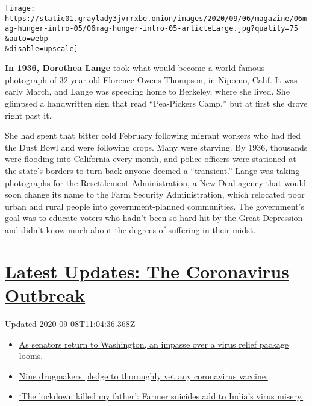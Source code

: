 \texttt{[image: https://static01.graylady3jvrrxbe.onion/images/2020/09/06/magazine/06mag-hunger-intro-05/06mag-hunger-intro-05-articleLarge.jpg?quality=75\\\&auto=webp\\\&disable=upscale]}

\textbf{In 1936, Dorothea Lange} took what would become a world-famous
photograph of 32-year-old Florence Owens Thompson, in Nipomo, Calif. It
was early March, and Lange was speeding home to Berkeley, where she
lived. She glimpsed a handwritten sign that read ``Pea-Pickers Camp,''
but at first she drove right past it.

She had spent that bitter cold February following migrant workers who
had fled the Dust Bowl and were following crops. Many were starving. By
1936, thousands were flooding into California every month, and police
officers were stationed at the state's borders to turn back anyone
deemed a ``transient.'' Lange was taking photographs for the
Resettlement Administration, a New Deal agency that would soon change
its name to the Farm Security Administration, which relocated poor urban
and rural people into government-planned communities. The government's
goal was to educate voters who hadn't been so hard hit by the Great
Depression and didn't know much about the degrees of suffering in their
midst.

\hypertarget{latest-updates-the-coronavirus-outbreak}{%
\section{\texorpdfstring{\href{https://www.nytimes3xbfgragh.onion/2020/09/08/world/covid-19-coronavirus.html?action=click\&pgtype=Article\&state=default\&region=MAIN_CONTENT_1\&context=storylines_live_updates}{Latest
Updates: The Coronavirus
Outbreak}}{Latest Updates: The Coronavirus Outbreak}}\label{latest-updates-the-coronavirus-outbreak}}

Updated 2020-09-08T11:04:36.368Z

\begin{itemize}
\tightlist
\item
  \href{https://www.nytimes3xbfgragh.onion/2020/09/08/world/covid-19-coronavirus.html?action=click\&pgtype=Article\&state=default\&region=MAIN_CONTENT_1\&context=storylines_live_updates\#link-4a77847f}{As
  senators return to Washington, an impasse over a virus relief package
  looms.}
\item
  \href{https://www.nytimes3xbfgragh.onion/2020/09/08/world/covid-19-coronavirus.html?action=click\&pgtype=Article\&state=default\&region=MAIN_CONTENT_1\&context=storylines_live_updates\#link-679303d7}{Nine
  drugmakers pledge to thoroughly vet any coronavirus vaccine.}
\item
  \href{https://www.nytimes3xbfgragh.onion/2020/09/08/world/covid-19-coronavirus.html?action=click\&pgtype=Article\&state=default\&region=MAIN_CONTENT_1\&context=storylines_live_updates\#link-1c973131}{`The
  lockdown killed my father': Farmer suicides add to India's virus
  misery.}
\end{itemize}

